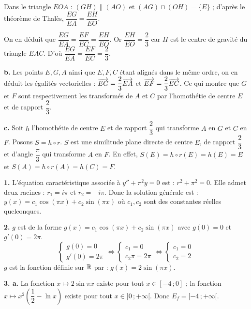\documentclass[11pt]{article}
\begin{document}
Dans le triangle $EOA$ : $(GH) \parallel (AO)$ et $(AG) \cap (OH) = \{E\}$ ; d'après le théorème de Thalès, $\dfrac{EG}{EA} = \dfrac{EH}{EO}$.

On en déduit que $\dfrac{EG}{EA} = \dfrac{EF}{EC} = \dfrac{EH}{EO}$. Or $\dfrac{EH}{EO} = \dfrac{2}{3}$ car $H$ est le centre de gravité du triangle $EAC$. D'où $\dfrac{EG}{EA} = \dfrac{EF}{EC} = \dfrac{2}{3}$.

\textbf{b.} Les points $E, G, A$ ainsi que $E, F, C$ étant alignés dans le même ordre, on en déduit les égalités vectorielles : $\overrightarrow{EG} = \dfrac{2}{3}\overrightarrow{EA}$ et $\overrightarrow{EF} = \dfrac{2}{3}\overrightarrow{EC}$. Ce qui montre que $G$ et $F$ sont respectivement les transformés de $A$ et $C$ par l'homothétie de centre $E$ et de rapport $\dfrac{2}{3}$.

\textbf{c.} Soit $h$ l'homothétie de centre $E$ et de rapport $\dfrac{2}{3}$ qui transforme $A$ en $G$ et $C$ en $F$. Posons $S = h \circ r$. $S$ est une similitude plane directe de centre $E$, de rapport $\dfrac{2}{3}$ et d'angle $\dfrac{\pi}{3}$ qui transforme $A$ en $F$. En effet, $S(E) = h \circ r(E) = h(E) = E$ et $S(A) = h \circ r(A) = h(C) = F$.

\prob{}

\textbf{1.} L'équation caractéristique associée à $y'' + \pi^2 y = 0$ est : $r^2 + \pi^2 = 0$. Elle admet deux racines : $r_1 = i\pi$ et $r_2 = -i\pi$. Donc la solution générale est : $y(x) = c_1\cos(\pi x) + c_2\sin(\pi x)$ où $c_1, c_2$ sont des constantes réelles quelconques.

\textbf{2.} $g$ est de la forme $g(x) = c_1\cos(\pi x) + c_2\sin(\pi x)$ avec $g(0) = 0$ et $g'(0) = 2\pi$.
\[ \begin{cases} g(0) = 0 \\ g'(0) = 2\pi \end{cases} \Longleftrightarrow \begin{cases} c_1 = 0 \\ c_2\pi = 2\pi \end{cases} \Longleftrightarrow \begin{cases} c_1 = 0 \\ c_2 = 2 \end{cases} \]
$g$ est la fonction définie sur $\mathbb{R}$ par : $g(x) = 2\sin(\pi x)$.

\textbf{3. a.} La fonction $x \mapsto 2\sin\pi x$ existe pour tout $x \in [-4\,;0]$ ; la fonction $x \mapsto x^2\left(\dfrac{1}{2} - \ln x\right)$ existe pour tout $x \in ]0\,;+\infty[$. Donc $E_f = [-4\,;+\infty[$.
\end{document}
